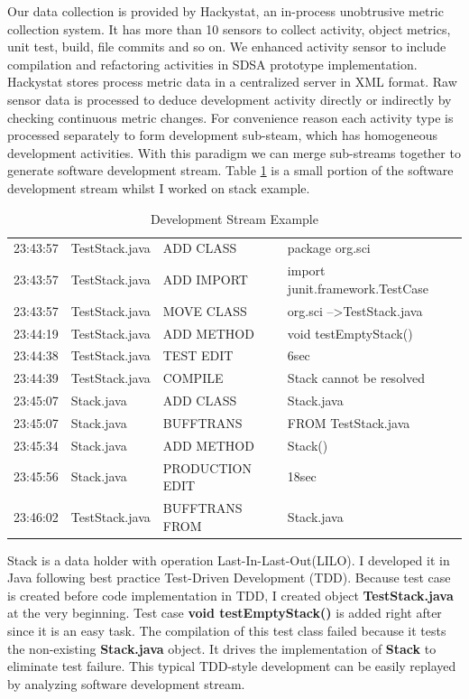 Our data collection is provided by Hackystat, an in-process unobtrusive metric
collection system. It has more than 10 sensors to collect activity, object metrics, 
unit test, build, file commits and so on. We enhanced activity sensor to include 
compilation and refactoring activities in SDSA prototype implementation. Hackystat
stores process metric data in a centralized server in XML format. Raw sensor data
is processed to deduce development activity directly or indirectly by checking
continuous metric changes. For convenience reason each activity type is processed
separately to form development sub-steam, which has homogeneous development activities. 
With this paradigm we can merge sub-streams together to generate software development
stream. Table \ref{tab:stackstream} is a small portion of the software development 
stream whilst I worked on stack example. 
\begin{table}[!h]
\centering
  \begin{tabular}{|llll|}
  \hline
    23:43:57 & TestStack.java & ADD CLASS & package org.sci \\
    23:43:57 & TestStack.java & ADD IMPORT & import junit.framework.TestCase \\
    23:43:57 & TestStack.java & MOVE CLASS & org.sci --\textgreater TestStack.java \\
    23:44:19 & TestStack.java & ADD METHOD & void testEmptyStack() \\
    23:44:38 & TestStack.java & TEST EDIT & 6sec \\
    23:44:39 & TestStack.java & COMPILE & Stack cannot be resolved \\
    23:45:07 & Stack.java     & ADD CLASS & Stack.java \\
    23:45:07 & Stack.java     & BUFFTRANS & FROM TestStack.java \\
    23:45:34 & Stack.java     & ADD METHOD & Stack() \\
    23:45:56 & Stack.java     & PRODUCTION EDIT & 18sec \\
    23:46:02 & TestStack.java & BUFFTRANS FROM & Stack.java \\
  \hline
  \end{tabular}
  \caption{Development Stream Example}\label{tab:stackstream}  
\end{table}
Stack is a data holder with operation Last-In-Last-Out(LILO). I developed it in Java
following best practice Test-Driven Development (TDD). Because test case is created 
before code implementation in TDD, I created object \textsf{\textbf{TestStack.java}} 
at the very beginning. Test case \textsf{\textbf{void testEmptyStack()}} is added right
after since it is an easy task. The compilation of this test class failed because it
tests the non-existing \textsf{\textbf{Stack.java}} object. It drives the implementation
of \textsf{\textbf{Stack}} to eliminate test failure. This typical TDD-style 
development can be easily replayed by analyzing software development stream.

